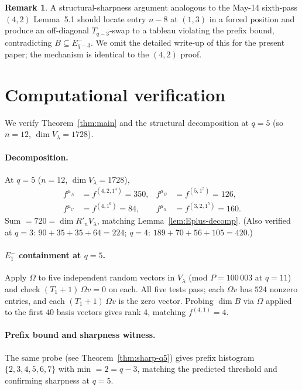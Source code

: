 \documentclass[11pt]{article}
\theoremstyle{definition}
\newtheorem{remark}[theorem]{Remark}
\newcommand{\Om}{\Omega}
\newcommand{\Rp}{{R'}}
\begin{document}
\begin{remark}\label{rem:structural-sharp}
A structural-sharpness argument analogous to the May-14 sixth-pass
$(4, 2)$ Lemma~5.1 should locate entry $n - 8$ at $(1, 3)$ in a forced
position and produce an off-diagonal $T_{q - 3}$-swap to a tableau
violating the prefix bound, contradicting $B \subseteq E_{q-3}^-$.
We omit the detailed write-up of this for the present paper; the
mechanism is identical to the $(4, 2)$ proof.
\end{remark}

\section{Computational verification}\label{sec:verify}

We verify Theorem~\ref{thm:main} and the structural decomposition at
$q = 5$ (so $n = 12$, $\dim V_\lambda = 1728$).

\paragraph{Decomposition.}  At $q = 5$ ($n = 12$, $\dim V_\lambda = 1728$),
\begin{align*}
   f^{\mu_A} &= f^{(4, 2, 1^4)} = 350, &
   f^{\mu_B} &= f^{(5, 1^5)} = 126, \\
   f^{\mu_C} &= f^{(4, 1^6)} = 84, &
   f^{\mu_h} &= f^{(3, 2, 1^5)} = 160.
\end{align*}
Sum $= 720 = \dim \Rp_n V_\lambda$, matching
Lemma~\ref{lem:Eplus-decomp}.  (Also verified at $q = 3$:
$90 + 35 + 35 + 64 = 224$; $q = 4$: $189 + 70 + 56 + 105 = 420$.)

\paragraph{$E_1^-$ containment at $q = 5$.}  Apply $\Om$ to five
independent random vectors in $V_\lambda$ (mod $P = 100\,003$ at
$q = 11$) and check $(T_1 + 1)\,\Om v = 0$ on each.  All five tests
pass; each $\Om v$ has $524$ nonzero entries, and each $(T_1 + 1)\,\Om
v$ is the zero vector.  Probing $\dim B$ via $\Om$ applied to the
first $40$ basis vectors gives rank $4$, matching $f^{(4, 1)} = 4$.

\paragraph{Prefix bound and sharpness witness.}  The same probe (see
Theorem~\ref{thm:sharp-q5}) gives prefix histogram
$\{2, 3, 4, 5, 6, 7\}$ with min $= 2 = q - 3$, matching the predicted
threshold and confirming sharpness at $q = 5$.
\end{document}
